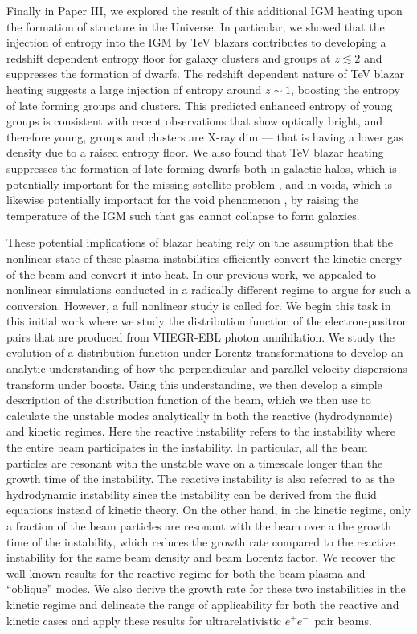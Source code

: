 \documentclass[usenatbib,iop,apj,numberedappendix]{aeb_emulateapj_2010}
\newcommand{\epm}{\ensuremath{e^+e^-}}
\begin{document}
Finally in Paper III, we explored the result of this additional IGM heating upon
the formation of structure in the Universe.  In particular, we showed that
the injection of entropy into the IGM by TeV blazars contributes to
developing a redshift dependent entropy floor for galaxy clusters and groups at
$z\lesssim 2$ and suppresses the formation of dwarfs.  The redshift dependent nature of TeV blazar heating suggests a large injection of entropy around $z\sim 1$, boosting the entropy of late forming groups and clusters.  This predicted enhanced entropy
of young groups is consistent with recent observations 
that show optically bright, and therefore young, groups and
clusters are X-ray dim ---  that is having a lower gas density due to a
raised entropy floor.  We also found that TeV
blazar heating suppresses the formation of late forming dwarfs both in
galactic halos, which is potentially important for the missing satellite problem \citep{Krav:10}, and
in voids, which is likewise potentially important for the void phenomenon \citep{Peebles2001}, by raising the
temperature of the IGM such that gas cannot collapse to form galaxies.

These potential implications of blazar heating rely on the assumption that the nonlinear state of these plasma instabilities efficiently convert the kinetic energy of the beam and convert it into heat.  In our previous work, we appealed to nonlinear simulations conducted in a radically different regime to argue for such a conversion.  However, a full nonlinear study is called for.  We begin this task in this initial work where we study the distribution function of the electron-positron pairs that are produced from VHEGR-EBL photon annihilation.  We study the evolution of a distribution function under Lorentz transformations to develop an analytic understanding of how the perpendicular and parallel velocity dispersions transform under boosts.  Using this understanding, we then develop a simple description of the distribution function of the beam, which we then use to calculate the unstable modes analytically in both the reactive (hydrodynamic) and kinetic regimes. Here the reactive instability refers to the instability where the entire beam participates in the instability.  In particular, all the beam particles are resonant with the unstable wave on a timescale longer than the growth time of the instability.  The reactive instability is also referred to as the hydrodynamic instability since the instability can be derived from the fluid equations instead of kinetic theory.  On the other hand, in the kinetic regime, only a fraction of the beam particles are resonant with the beam over a the growth time of the instability, which reduces the growth rate compared to the reactive instability for the same beam density and beam Lorentz factor.  We recover the well-known results for the reactive regime for both the beam-plasma and ``oblique'' modes.  We also derive the growth rate for these two instabilities in the kinetic regime and delineate the range of applicability for both the reactive and kinetic cases and apply these results for ultrarelativistic \epm\ pair beams. 
\end{document}
